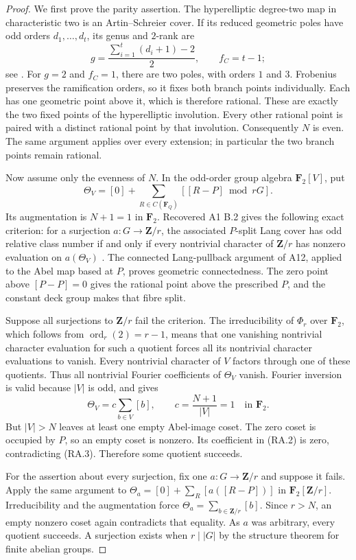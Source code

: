 \begin{proof}
We first prove the parity assertion.  The hyperelliptic
degree-two map in characteristic two is an Artin--Schreier
cover.  If its reduced geometric poles have odd orders
$d_1,\ldots,d_t$, its genus and $2$-rank are
\[
       g=\frac{\sum_{i=1}^t(d_i+1)-2}{2},
       \qquad f_C=t-1;
\]
see \cite[Lemma~2.6, p.~712]{PriesZhu2012}.
For $g=2$ and $f_C=1$, there are two poles, with
orders $1$ and $3$.  Frobenius preserves the ramification
orders, so it fixes both branch points individually.
Each has one geometric point above it, which is therefore
rational.  These are exactly the two fixed points of the
hyperelliptic involution.  Every other rational point is
paired with a distinct rational point by that involution.
Consequently $N$ is even.  The same argument applies over
every extension; in particular the two branch points remain
rational.

Now assume only the evenness of $N$.
In the odd-order group algebra $\mathbf F_2[V]$, put
\[
 \Theta_V=[0]+\sum_{R\in C(\mathbf F_Q)}[[R-P]\bmod rG].
\tag{RA.2}
\]
Its augmentation is $N+1=1$ in $\mathbf F_2$.
Recovered A1 B.2 gives the following exact criterion:
for a surjection $a:G\to\mathbf Z/r$, the associated
$P$-split Lang cover has odd relative class number if and
only if every nontrivial character of $\mathbf Z/r$ has
nonzero evaluation on $a(\Theta_V)$
\cite[B.2]{A1run}.
The connected Lang-pullback argument of A12, applied
to the Abel map based at $P$, proves geometric connectedness.
The zero point above $[P-P]=0$ gives the rational point
above the prescribed $P$, and the constant deck group
makes that fibre split.

Suppose all surjections to $\mathbf Z/r$ fail the criterion.
The irreducibility of $\Phi_r$ over $\mathbf F_2$, which
follows from $\operatorname{ord}_r(2)=r-1$, means that
one vanishing nontrivial character evaluation for such a
quotient forces all its nontrivial character evaluations
to vanish.  Every nontrivial character of $V$ factors
through one of these quotients.  Thus all nontrivial
Fourier coefficients of $\Theta_V$ vanish.
Fourier inversion is valid because $|V|$ is odd, and gives
\[
        \Theta_V=c\sum_{b\in V}[b],\qquad
        c=\frac{N+1}{|V|}=1\quad\text{in }\mathbf F_2.
\tag{RA.3}
\]
But $|V|>N$ leaves at least one empty Abel-image coset.
The zero coset is occupied by $P$, so an empty coset is
nonzero.  Its coefficient in (RA.2) is zero, contradicting
(RA.3).  Therefore some quotient succeeds.

For the assertion about every surjection, fix one
$a:G\to\mathbf Z/r$ and suppose it fails.
Apply the same argument to
$\Theta_a=[0]+\sum_R[a([R-P])]$ in
$\mathbf F_2[\mathbf Z/r]$.
Irreducibility and the augmentation force
$\Theta_a=\sum_{b\in\mathbf Z/r}[b]$.
Since $r>N$, an empty nonzero coset again contradicts
that equality.  As $a$ was arbitrary, every quotient
succeeds.  A surjection exists when $r\mid|G|$ by the
structure theorem for finite abelian groups.
\end{proof}

